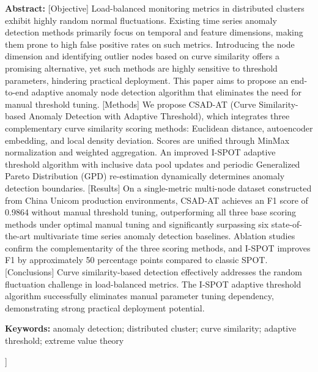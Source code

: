 \documentclass[10.5pt,a4paper,twocolumn]{ctexart}
\begin{document}
\begin{@twocolumnfalse}
\begin{center}
\parbox{0.92\textwidth}{
\textbf{Abstract:} [Objective] Load-balanced monitoring metrics in distributed clusters exhibit highly random normal fluctuations. Existing time series anomaly detection methods primarily focus on temporal and feature dimensions, making them prone to high false positive rates on such metrics. Introducing the node dimension and identifying outlier nodes based on curve similarity offers a promising alternative, yet such methods are highly sensitive to threshold parameters, hindering practical deployment. This paper aims to propose an end-to-end adaptive anomaly node detection algorithm that eliminates the need for manual threshold tuning. [Methods] We propose CSAD-AT (Curve Similarity-based Anomaly Detection with Adaptive Threshold), which integrates three complementary curve similarity scoring methods: Euclidean distance, autoencoder embedding, and local density deviation. Scores are unified through MinMax normalization and weighted aggregation. An improved I-SPOT adaptive threshold algorithm with inclusive data pool updates and periodic Generalized Pareto Distribution (GPD) re-estimation dynamically determines anomaly detection boundaries. [Results] On a single-metric multi-node dataset constructed from China Unicom production environments, CSAD-AT achieves an F1 score of 0.9864 without manual threshold tuning, outperforming all three base scoring methods under optimal manual tuning and significantly surpassing six state-of-the-art multivariate time series anomaly detection baselines. Ablation studies confirm the complementarity of the three scoring methods, and I-SPOT improves F1 by approximately 50 percentage points compared to classic SPOT. [Conclusions] Curve similarity-based detection effectively addresses the random fluctuation challenge in load-balanced metrics. The I-SPOT adaptive threshold algorithm successfully eliminates manual parameter tuning dependency, demonstrating strong practical deployment potential.
}
\vspace{0.4em}

\parbox{0.92\textwidth}{
\textbf{Keywords:} anomaly detection; distributed cluster; curve similarity; adaptive threshold; extreme value theory
}
\vspace{1.5em}
\end{center}
\end{@twocolumnfalse}
]


\end{document}
